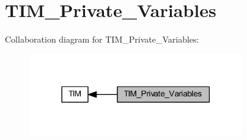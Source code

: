\hypertarget{group___t_i_m___private___variables}{}\section{T\+I\+M\+\_\+\+Private\+\_\+\+Variables}
\label{group___t_i_m___private___variables}
Collaboration diagram for T\+I\+M\+\_\+\+Private\+\_\+\+Variables\+:
\nopagebreak
\begin{figure}[H]
\begin{center}
\leavevmode
\includegraphics[width=261pt]{group___t_i_m___private___variables}
\end{center}
\end{figure}
